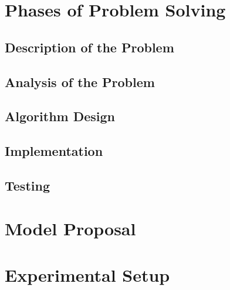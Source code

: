 
\section{Phases of Problem Solving}


\subsection{Description of the Problem}



\subsection{Analysis of the Problem}



\subsection{Algorithm Design}



\subsection{Implementation}

\subsection{Testing}


\section{Model Proposal}


\section{Experimental Setup}
